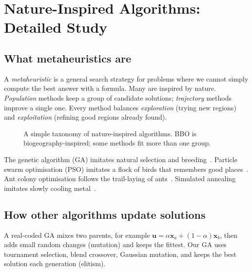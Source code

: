 \chapter{Nature-Inspired Algorithms: Detailed Study}
\section{What metaheuristics are}
A \emph{metaheuristic} is a general search strategy for problems where we cannot simply compute the best answer with a formula. Many are inspired by nature. \emph{Population} methods keep a group of candidate solutions; \emph{trajectory} methods improve a single one. Every method balances \emph{exploration} (trying new regions) and \emph{exploitation} (refining good regions already found).

\begin{figure}[htbp]\centering
{}
\caption{A simple taxonomy of nature-inspired algorithms. BBO is biogeography-inspired; some methods fit more than one group.}
\end{figure}

The genetic algorithm (GA) imitates natural selection and breeding~\cite{holland1992adaptation}. Particle swarm optimisation (PSO) imitates a flock of birds that remembers good places~\cite{kennedy1995pso}. Ant colony optimisation follows the trail-laying of ants~\cite{dorigo1996aco}. Simulated annealing imitates slowly cooling metal~\cite{kirkpatrick1983annealing}.

\section{How other algorithms update solutions}
A real-coded GA mixes two parents, for example $\mathbf u=\alpha\mathbf x_a+(1-\alpha)\mathbf x_b$, then adds small random changes (mutation) and keeps the fittest. Our GA uses tournament selection, blend crossover, Gaussian mutation, and keeps the best solution each generation (elitism).

